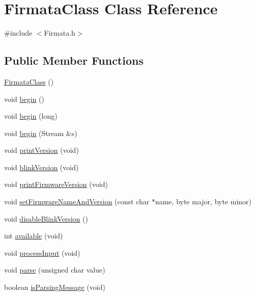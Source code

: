 \hypertarget{class_firmata_class}{}\section{Firmata\+Class Class Reference}
\label{class_firmata_class}


{\ttfamily \#include $<$Firmata.\+h$>$}

\subsection*{Public Member Functions}
\begin{DoxyCompactItemize}
\item 
\hyperlink{class_firmata_class_a75b035ab8d96d87d28deeb87badfe11a}{Firmata\+Class} ()
\item 
void \hyperlink{class_firmata_class_a2fddcc643892bec2f4aa7aef6dba70eb}{begin} ()
\item 
void \hyperlink{class_firmata_class_ab0b7b837d2c32b4ce79e62895ced2731}{begin} (long)
\item 
void \hyperlink{class_firmata_class_a0c7b0e10168e3c5dc6442d77c65a156e}{begin} (Stream \&s)
\item 
void \hyperlink{class_firmata_class_abd8a0370db6d9e923e7e3d5836e78d7a}{print\+Version} (void)
\item 
void \hyperlink{class_firmata_class_a9421550f2501fc1df60fd174b154e606}{blink\+Version} (void)
\item 
void \hyperlink{class_firmata_class_abe49261eab0bd4892a09fa8b8980b11a}{print\+Firmware\+Version} (void)
\item 
void \hyperlink{class_firmata_class_ab7aa66b528027566c15b7d64c8cd0f89}{set\+Firmware\+Name\+And\+Version} (const char $\ast$name, byte major, byte minor)
\item 
void \hyperlink{class_firmata_class_a5ddba465c3772f841828ef82c79d4307}{disable\+Blink\+Version} ()
\item 
int \hyperlink{class_firmata_class_a119734b867186567c1cd011e52e59d2d}{available} (void)
\item 
void \hyperlink{class_firmata_class_aa698f5f5a234173d5eebb54831350676}{process\+Input} (void)
\item 
void \hyperlink{class_firmata_class_aaeaac8b1f8facf070615b0035120c432}{parse} (unsigned char value)
\item 
boolean \hyperlink{class_firmata_class_a58e9d787957c3085f22d33b59b1f6ea6}{is\+Parsing\+Message} (void)
\item 

\end{DoxyCompactItemize}
